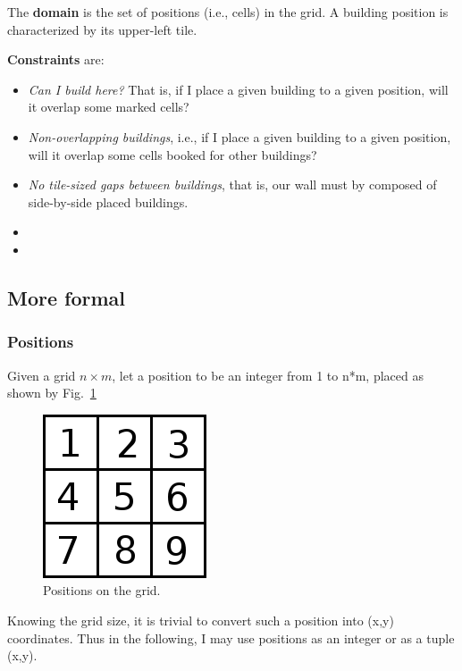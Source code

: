 \documentclass[a4paper,11pt]{article}
\begin{document}
The  {\bf  domain}  is the  set  of  positions  (i.e., cells)  in  the
grid. A building position is characterized by its upper-left tile.

{\bf Constraints} are:
\begin{itemize}
\item {\em Can I build here?} That  is, if I place a given building to
  a given position, will it overlap some marked cells?
\item {\em Non-overlapping buildings}, i.e., if I place a given building to
  a  given position,  will  it  overlap some  cells  booked for  other
  buildings?
\item {\em  No tile-sized gaps  between buildings}, that is,  our wall
  must by composed of side-by-side placed buildings.
  \item {}
  \item {}
\end{itemize}

\subsection{More formal}

\subsubsection{Positions}

Given a grid $n  \times m$, let a position to be  an integer from 1 to
n*m, placed as shown by Fig.~\ref{figs:positions}

\begin{figure}[!ht]
  \centering
  \includegraphics[width=.3\linewidth]{figs/positions}
  \caption{Positions on the grid.}
  \label{figs:positions}
\end{figure}

Knowing the grid  size, it is trivial to convert  such a position into
(x,y) coordinates.  Thus in the following,  I may use  positions as an
integer or as a tuple (x,y).
\end{document}
